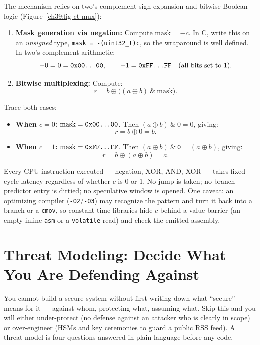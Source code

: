 The mechanism relies on two's complement sign expansion and bitwise Boolean logic (Figure~\ref{ch39:fig-ct-mux}):
\begin{enumerate}
  \item \textbf{Mask generation via negation:} Compute $\text{mask} = -c$. In C, write this on an \emph{unsigned} type, \texttt{mask = -(uint32\_t)c}, so the wraparound is well defined. In two's complement arithmetic:
  \[
  -0 = 0 = \texttt{0x00\dots00}, \qquad -1 = \texttt{0xFF\dots FF} \quad (\text{all bits set to } 1).
  \]
  \item \textbf{Bitwise multiplexing:} Compute:
  \[
  r = b \oplus \big((a \oplus b) \ \& \ \text{mask}\big).
  \]
\end{enumerate}

Trace both cases:
\begin{itemize}
  \item \textbf{When $c = 0$:} $\text{mask} = \texttt{0x00\dots00}$. Then $(a \oplus b) \ \& \ 0 = 0$, giving:
  \[
  r = b \oplus 0 = b.
  \]
  \item \textbf{When $c = 1$:} $\text{mask} = \texttt{0xFF\dots FF}$. Then $(a \oplus b) \ \& \ \texttt{\~{}0} = (a \oplus b)$, giving:
  \[
  r = b \oplus (a \oplus b) = a.
  \]
\end{itemize}

Every CPU instruction executed --- negation, XOR, AND, XOR --- takes fixed cycle latency regardless of whether $c$ is 0 or 1. No jump is taken; no branch predictor entry is dirtied; no speculative window is opened. One caveat: an optimizing compiler (\texttt{-O2}/\texttt{-O3}) may recognize the pattern and turn it back into a branch or a \texttt{cmov}, so constant-time libraries hide $c$ behind a value barrier (an empty inline-\texttt{asm} or a \texttt{volatile} read) and check the emitted assembly.

\section{Threat Modeling: Decide What You Are Defending Against}
\label{ch39:threat}

You cannot build a secure system without first writing down what ``secure'' means
for it --- against whom, protecting what, assuming what. Skip this and you will
either under-protect (no defense against an attacker who is clearly in scope) or
over-engineer (HSMs and key ceremonies to guard a public RSS feed). A threat model
is four questions answered in plain language before any code.

